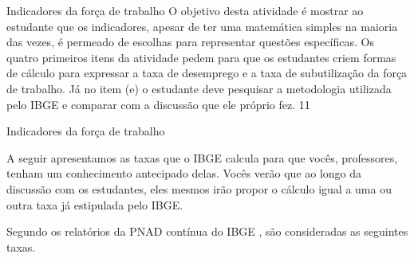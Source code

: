\clearmargin
\begin{objectives}{Indicadores da força de trabalho}
{
  O objetivo desta atividade é mostrar ao estudante que os indicadores, apesar de ter uma matemática simples na maioria das vezes, é permeado de escolhas para representar questões específicas. Os quatro primeiros itens da atividade pedem para que os estudantes criem formas de cálculo para expressar a taxa de desemprego e a taxa de subutilização da força de trabalho. Já no item (e) o estudante deve pesquisar a metodologia utilizada pelo IBGE e comparar com a discussão que ele próprio fez.
}{1}{1}
\end{objectives}
\begin{sugestions}{Indicadores da força de trabalho}
{
  A seguir apresentamos as taxas que o IBGE calcula para que vocês, professores, tenham um conhecimento antecipado delas. Vocês verão que ao longo da discussão com os estudantes, eles mesmos irão propor o cálculo igual a uma ou outra taxa já estipulada pelo IBGE.

  Segundo os relatórios da PNAD contínua do IBGE \cite{brasil2020}, são consideradas as seguintes taxas.

  \begin{table}[H]
  \centering
  

\end{table}}
\end{sugestions}
